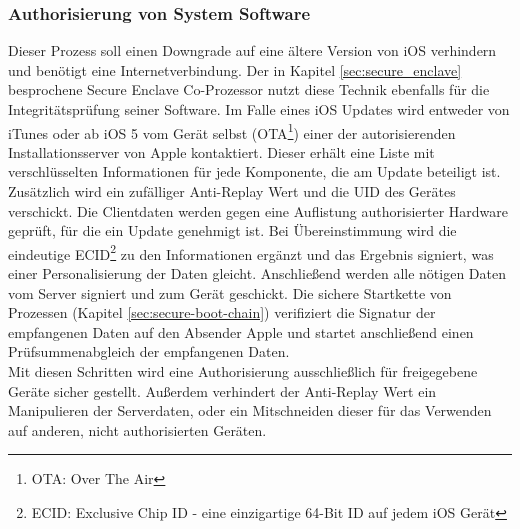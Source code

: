 	\subsubsection{Authorisierung von System Software}\label{sec:code-signing}
		Dieser Prozess soll einen Downgrade auf eine ältere Version von iOS
		verhindern und benötigt eine Internetverbindung. Der in Kapitel
		\ref{sec:secure_enclave} besprochene Secure Enclave Co-Prozessor nutzt diese
		Technik ebenfalls für die Integritätsprüfung seiner Software. Im Falle eines
		iOS Updates wird entweder von iTunes oder ab iOS 5 vom Gerät selbst
		(OTA\footnote{OTA: Over The Air}) einer der autorisierenden
		Installationsserver von Apple kontaktiert. Dieser erhält eine Liste mit
		verschlüsselten Informationen für jede Komponente, die am Update beteiligt
		ist.
		Zusätzlich wird ein zufälliger Anti-Replay Wert und die UID des Gerätes
		verschickt. Die Clientdaten werden gegen eine Auflistung authorisierter
		Hardware geprüft, für die ein Update genehmigt ist. Bei
		Übereinstimmung wird die eindeutige ECID\footnote{ECID: Exclusive Chip ID - eine einzigartige
		64-Bit ID auf jedem iOS Gerät} zu den Informationen ergänzt und das
		Ergebnis signiert, was einer Personalisierung der Daten gleicht.
		Anschließend werden alle nötigen Daten vom Server signiert und zum Gerät
		geschickt. Die sichere Startkette von Prozessen (Kapitel
		\ref{sec:secure-boot-chain}) verifiziert die Signatur der empfangenen Daten
		auf den Absender Apple und startet anschließend einen Prüfsummenabgleich
		der empfangenen Daten.\\
		Mit diesen Schritten wird eine Authorisierung ausschließlich für freigegebene
		Geräte sicher gestellt. Außerdem verhindert der Anti-Replay Wert ein
		Manipulieren der Serverdaten, oder ein Mitschneiden dieser für
		das Verwenden auf anderen, nicht authorisierten Geräten.
		
